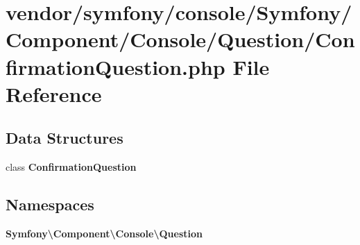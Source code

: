 \section{vendor/symfony/console/\+Symfony/\+Component/\+Console/\+Question/\+Confirmation\+Question.php File Reference}
\label{_confirmation_question_8php}
\subsection*{Data Structures}
\begin{DoxyCompactItemize}
\item 
class {\bf Confirmation\+Question}
\end{DoxyCompactItemize}
\subsection*{Namespaces}
\begin{DoxyCompactItemize}
\item 
 {\bf Symfony\textbackslash{}\+Component\textbackslash{}\+Console\textbackslash{}\+Question}
\end{DoxyCompactItemize}
